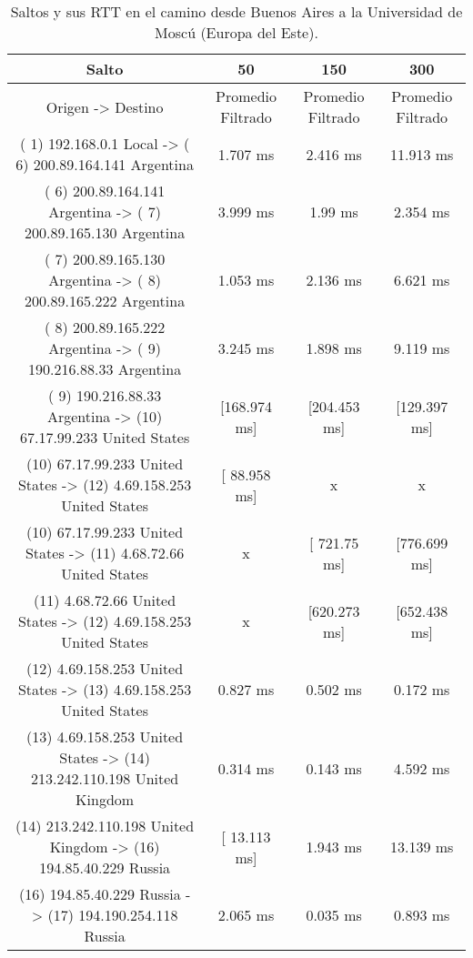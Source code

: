 \begin{table}[]
\centering
\caption{Saltos y sus RTT en el camino desde Buenos Aires a la Universidad de Moscú (Europa del Este).}
\begin{tabular}{ | c | c | c | c | }
	\hline 
Salto	& 50	& 150	& 300 \\ \hline
Origen                ->               Destino               	                 & Promedio Filtrado	 & Promedio Filtrado&	Promedio Filtrado\\ \hline
( 1) 192.168.0.1     Local           -> ( 6) 200.89.164.141  Argentina     & 	     1.707 ms   	 &    2.416 ms   	  &  11.913 ms   \\ \hline
( 6) 200.89.164.141  Argentina       -> ( 7) 200.89.165.130  Argentina     & 	     3.999 ms   	 &     1.99 ms   	  &   2.354 ms   \\ \hline
( 7) 200.89.165.130  Argentina       -> ( 8) 200.89.165.222  Argentina     & 	     1.053 ms   	 &    2.136 ms   	  &   6.621 ms   \\ \hline
( 8) 200.89.165.222  Argentina       -> ( 9) 190.216.88.33   Argentina     & 	     3.245 ms   	 &    1.898 ms   	  &   9.119 ms   \\ \hline
( 9) 190.216.88.33   Argentina       -> (10) 67.17.99.233    United States & 	  [168.974 ms]  	 & [204.453 ms]  	  &[129.397 ms]  \\ \hline
(10) 67.17.99.233    United States   -> (12) 4.69.158.253    United States  	 & [ 88.958 ms]       &      	x	         &    x\\ \hline
(10) 67.17.99.233    United States   -> (11) 4.68.72.66      United States & 	x &	  [ 721.75 ms]  &	  [776.699 ms]  & \\ \hline
(11) 4.68.72.66      United States   -> (12) 4.69.158.253    United States & 	x &	  [620.273 ms]  &	  [652.438 ms]  & \\ \hline
(12) 4.69.158.253    United States   -> (13) 4.69.158.253    United States & 	     0.827 ms   	 &    0.502 ms   	  &   0.172 ms   \\ \hline
(13) 4.69.158.253    United States   -> (14) 213.242.110.198 United Kingdom& 	     0.314 ms   	 &    0.143 ms   	  &   4.592 ms   \\ \hline
(14) 213.242.110.198 United Kingdom  -> (16) 194.85.40.229   Russia        & 	  [ 13.113 ms]  	 &    1.943 ms   	  &  13.139 ms   \\ \hline
(16) 194.85.40.229   Russia          -> (17) 194.190.254.118 Russia        & 	     2.065 ms   	 &    0.035 ms   	  &   0.893 ms   \\ \hline

\end{tabular}
\end{table}
